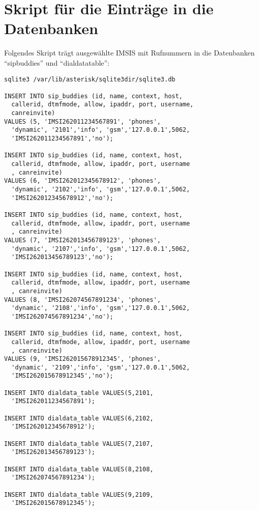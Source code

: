 \appendix
\section{Skript für die Einträge in die Datenbanken}
\label{app:A}
Folgendes Skript trägt ausgewählte IMSIS mit Rufnummern in die Datenbanken ``sip\textunderscore buddies'' und ``dialdata\textunderscore table'':

\begin{lstlisting}
sqlite3 /var/lib/asterisk/sqlite3dir/sqlite3.db

INSERT INTO sip_buddies (id, name, context, host, 
  callerid, dtmfmode, allow, ipaddr, port, username,
  canreinvite) 
VALUES (5, 'IMSI262011234567891', 'phones', 
  'dynamic', '2101','info', 'gsm','127.0.0.1',5062,
  'IMSI262011234567891','no');
  
INSERT INTO sip_buddies (id, name, context, host, 
  callerid, dtmfmode, allow, ipaddr, port, username
  , canreinvite) 
VALUES (6, 'IMSI262012345678912', 'phones', 
  'dynamic', '2102','info', 'gsm','127.0.0.1',5062,
  'IMSI262012345678912','no');
  
INSERT INTO sip_buddies (id, name, context, host,
  callerid, dtmfmode, allow, ipaddr, port, username
  , canreinvite) 
VALUES (7, 'IMSI262013456789123', 'phones', 
  'dynamic', '2107','info', 'gsm','127.0.0.1',5062,
  'IMSI262013456789123','no');
  
INSERT INTO sip_buddies (id, name, context, host,
  callerid, dtmfmode, allow, ipaddr, port, username
  , canreinvite) 
VALUES (8, 'IMSI262074567891234', 'phones', 
  'dynamic', '2108','info', 'gsm','127.0.0.1',5062,
  'IMSI262074567891234','no');
  
INSERT INTO sip_buddies (id, name, context, host,
  callerid, dtmfmode, allow, ipaddr, port, username
  , canreinvite) 
VALUES (9, 'IMSI262015678912345', 'phones', 
  'dynamic', '2109','info', 'gsm','127.0.0.1',5062,
  'IMSI262015678912345','no');

INSERT INTO dialdata_table VALUES(5,2101,
  'IMSI262011234567891');

INSERT INTO dialdata_table VALUES(6,2102,
  'IMSI262012345678912');

INSERT INTO dialdata_table VALUES(7,2107,
  'IMSI262013456789123');

INSERT INTO dialdata_table VALUES(8,2108,
  'IMSI262074567891234');

INSERT INTO dialdata_table VALUES(9,2109,
  'IMSI262015678912345');
\end{lstlisting}